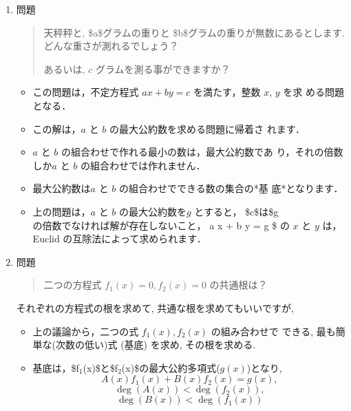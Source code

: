 \documentclass[a4j]{jarticle}
\begin{document}
\begin{enumerate}
\item 問題
\label{sec:org082efde}

\begin{quote}
天秤秤と, \$a\$グラムの重りと \$b\$グラムの重りが無数にあるとします.
どんな重さが測れるでしょう？

あるいは, \(c\) グラムを測る事ができますか？
\end{quote}

\begin{itemize}
\item この問題は，不定方程式 \(a x + b y = c\) を満たす，整数 \(x\), \(y\) を求
める問題となる．

\item この解は，\(a\) と \(b\) の最大公約数を求める問題に帰着さ れます．

\item \(a\) と \(b\) の組合わせで作れる最小の数は，最大公約数であ
り，それの倍数しか\(a\) と \(b\) の組合わせでは作れません．

\item 最大公約数は\(a\) と \(b\) の組合わせでできる数の集合の*基
底*となります．

\item 上の問題は，\(a\) と \(b\) の最大公約数を\(g\) とすると，
\$c\$は\$g\(の倍数でなければ解が存在しないこと，\) a x + b y = g \$
の \(x\) と \(y\) は，Euclid の互除法によって求められます．
\end{itemize}

\item 問題
\label{sec:org1f08fc5}

\begin{quote}
二つの方程式 \(f_1(x)=0, f_2(x)=0\) の共通根は？
\end{quote}

それぞれの方程式の根を求めて, 共通な根を求めてもいいですが,

\begin{itemize}
\item 上の議論から，二つの式 \(f_1(x), f_2(x)\) の組み合わせで できる,
最も簡単な(次数の低い)式 (基底) を求め, その根を求める.

\item 基底は，\$f\(_{\text{1}}\)(x)\$と\$f\(_{\text{2}}\)(x)\$の最大公約多項式(\(g(x)\))となり,
$$A(x) f_1(x) + B(x) f_2(x) = g(x),$$ $$\deg(A(x)) < \deg(f_2(x)),$$
$$\deg(B(x)) < \deg(f_1(x))$$
\end{itemize}
\end{enumerate}
\end{document}
